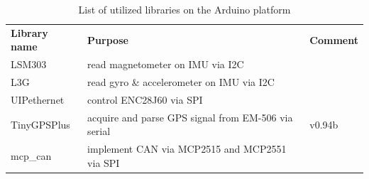 \documentclass[ExampleMasters.tex]{subfiles}
\begin{document}
\begin{table}[h]
	\label{tab:list_of_arduino_libs}
	\begin{tabular}{lll}
		\textbf{Library name} & \textbf{Purpose}                                    & \textbf{Comment} \\
		LSM303                & read magnetometer on IMU via I2C                    &                \cite{lsm303_github}  \\
		L3G                   & read gyro \& accelerometer on IMU via I2C           &      
		\cite{l3g_github}            \\
		UIPethernet           &     control ENC28J60 via SPI                                                &             \cite{uip_ethernet_github}     \\
		TinyGPSPlus           & acquire and parse GPS signal from EM-506 via serial & v0.94b\cite{tiny_gps_plus_github}     \\
		mcp\_can & implement CAN via MCP2515 and MCP2551 via SPI     & \cite{mcp_can_github}
	\end{tabular}
	
	\caption{List of utilized libraries on the Arduino platform}
\end{table}
\end{document}
